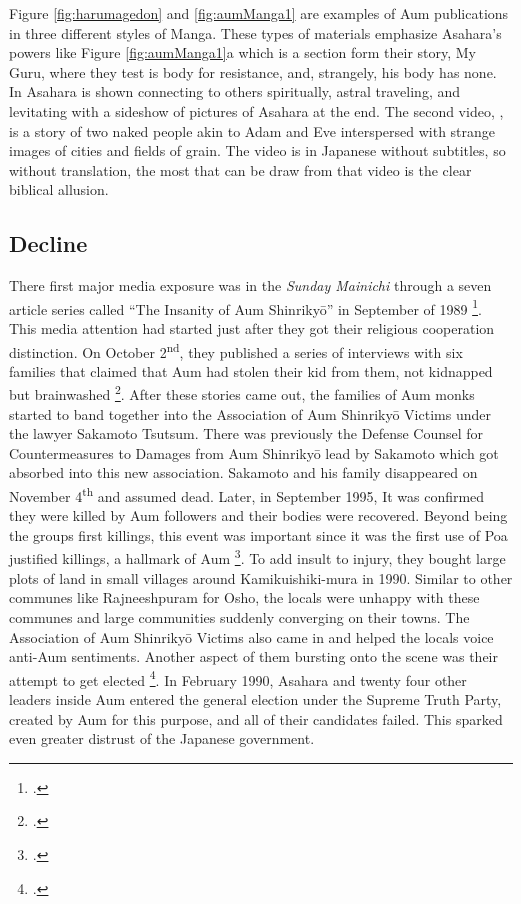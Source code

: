 \documentclass[12pt, letterpaper]{article}
\newcommand{\poses}[1]{#1's}
\newcommand{\say}[1]{``#1''}
\begin{document}
Figure \ref{fig:harumagedon} and \ref{fig:aumManga1} are examples of Aum publications in three different
styles of Manga. These types of materials emphasize \poses{Asahara} powers like Figure \ref{fig:aumManga1}a
which is a section form their story, My Guru, where they test is body for resistance, and, strangely, his 
body has none. In  Asahara is shown connecting to others spiritually,
astral traveling, and levitating with a sideshow of pictures of Asahara at the end. The second video,
, is a story of two naked people akin to Adam and Eve interspersed with
strange images of cities and fields of grain. The video is in Japanese without subtitles, so without
translation, the most that can be draw from that video is the clear biblical allusion.

\subsection{Decline}
There first major media exposure was in the \textit{Sunday Mainichi} through a seven article series called \say{The Insanity of Aum
  Shinriky\=o} in September of 1989 \footcite[35]{watanabe_reactions_1997}. This media attention had started
just after they got their religious cooperation distinction. On October  2\textsuperscript{nd}, they
published a series of interviews with six families that claimed that Aum had stolen their kid from them, not
kidnapped but brainwashed \footcite[184]{hardacre_aum_2007}. After these stories came out, the families of
Aum monks started to band together into the Association of Aum Shinriky\=o Victims under the lawyer Sakamoto
Tsutsum. There was previously the Defense Counsel for Countermeasures to Damages from Aum Shinriky\=o lead by
Sakamoto which got absorbed into this new association. Sakamoto and his family disappeared on November 
4\textsuperscript{th} and assumed dead. Later, in September 1995, It was confirmed they were killed by Aum
followers and their bodies were recovered. Beyond being the groups first killings, this event was important
since it was the first use of Poa justified killings, a hallmark of Aum 
\footcite[89]{watanabe_religion_1998}. To add insult to injury, they bought large plots of land in small
villages around Kamikuishiki-mura in 1990. Similar to other communes like Rajneeshpuram for Osho, the locals
were
unhappy with these communes and large communities suddenly converging on their towns. The Association of Aum
Shinriky\=o Victims also came in and helped the locals voice anti-Aum sentiments. Another aspect of them
bursting onto the scene was their attempt to get elected \footcite[187]{hardacre_aum_2007}. In February 1990,
Asahara and twenty four other leaders inside Aum entered the general election under the Supreme Truth Party,
created by Aum for this purpose, and all of their candidates failed. This sparked even greater distrust of
the Japanese government. 
\end{document}
